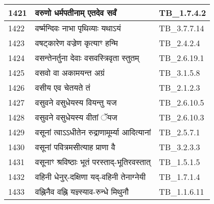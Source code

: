 \documentclass[17pt]{extarticle}
\begin{document}
\begin{longtable}{||p{0.4in}||p{4.9in}||p{0.9in}||}
    1421 & वरुणो धर्मपतीनाम् एतदेव सर्वं & TB\_1.7.4.2       \\
    
    \hline
        
    1422 & वर्ष्मन्दिवः नाभा पृथिव्याः यथाऽयं & TB\_3.7.7.14       \\
    
    \hline
        
    1423 & वषट्कारेण वज्रेण कृत्याꣳ हन्मि & TB\_2.4.2.4       \\
    
    \hline
        
    1424 & वसन्तेनर्तुना देवाः वसवस्त्रिवृता स्तुतम् & TB\_2.6.19.1       \\
    
    \hline
        
    1425 & वसवो वा अकामयन्त अग्रं & TB\_3.1.5.8       \\
    
    \hline
        
    1426 & वसीय एव चेतयते तं & TB\_2.1.2.3       \\
    
    \hline
        
    1427 & वसुवने वसुधेयस्य वियन्तु यज & TB\_2.6.10.5       \\
    
    \hline
        
    1428 & वसुवने वसुधेयस्य वीतां ॅयज & TB\_2.6.10.3       \\
    
    \hline
        
    1429 & वसूनां त्वाऽऽधीतेन रुद्राणामूर्म्या आदित्यानां & TB\_2.5.7.1       \\
    
    \hline
        
    1430 & वसूनां पवित्रमसीत्याह प्राणा वै & TB\_3.2.3.3       \\
    
    \hline
        
    1431 & वसूनाꣳ श्रविष्ठाः भूतं परस्ताद्{-}भूतिरवस्तात् & TB\_1.5.1.5       \\
    
    \hline
        
    1432 & वहिनी धेनुर्{-}दक्षिणा यद्{-}वहिनी तेनाग्नेयी & TB\_1.7.1.4       \\
    
    \hline
        
    1433 & वह्निनैव वह्नि यज्ञ्स्याव{-}रुन्धे मिथुनौ & TB\_1.1.6.11       \\
    

\end{longtable}
\end{document}
